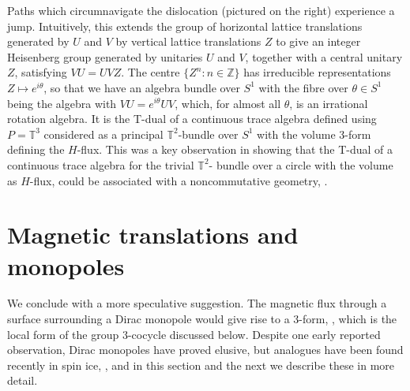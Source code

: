 \documentclass[11pt]{article}
\newcommand{\torus}{{\mathbb T}}
\newcommand{\integer}{{\mathbb Z}}
\begin{document}
Paths which circumnavigate the dislocation (pictured on the right) experience a jump. Intuitively, this extends the group of horizontal lattice translations generated by $U$ and  $V$ by vertical lattice translations $Z$ to give an integer Heisenberg group generated by unitaries $U$ and $V$, together with a central unitary $Z$, satisfying $VU = UVZ$.
The centre $\{Z^n: n\in \integer\}$ has irreducible representations $Z \mapsto e^{i\theta}$, so that we have an algebra bundle over $S^1$ with the fibre over $\theta \in S^1$ being the algebra with $VU = e^{i\theta}UV$, which, for almost all $\theta$, is an irrational rotation algebra. 
It is the T-dual of a continuous trace algebra defined using $P = \torus^3$ considered as a principal $\torus^2$-bundle over $S^1$ with the volume 3-form defining the $H$-flux.
This was a key observation in showing that the T-dual of a continuous trace algebra for the trivial $\torus^2$- bundle over a circle with the volume as $H$-flux, could be associated with a noncommutative geometry, \cite[\S 5]{MR}.




%
%


\section{Magnetic translations and monopoles}


We conclude with a more speculative suggestion. The magnetic flux through a surface surrounding a Dirac monopole would give rise to a 3-form, \cite{Di,WZ}, which is the local form of the group 3-cocycle discussed below.  Despite one early reported observation,  Dirac monopoles have proved elusive, but analogues have been found recently in spin ice, \cite{C08}, and in this section and the next we describe these in more detail.
\end{document}
